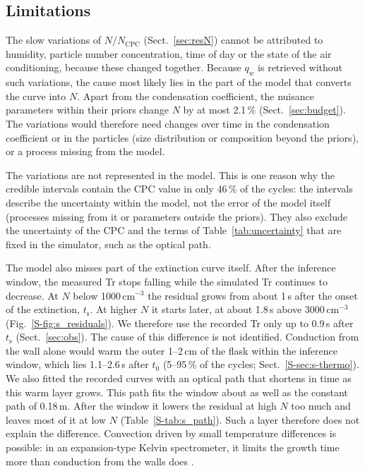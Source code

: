 \documentclass[preprint,review,12pt,authoryear]{elsarticle}
\begin{document}
\subsection{Limitations}
\label{sec:limitations}
The slow variations of $N/N_\mathrm{CPC}$ (Sect.~\ref{sec:resN}) cannot be attributed to
humidity, particle number concentration, time of day or the state of the air conditioning, because these
changed together.
Because $q_w$ is retrieved without such variations, the cause most likely lies in the part of the
model that converts the curve into $N$.
Apart from the condensation coefficient, the nuisance parameters within their priors change $N$ by
at most 2.1\,\% (Sect.~\ref{sec:budget}).
The variations would therefore need changes over time in the condensation coefficient or in the particles
(size distribution or composition beyond the priors), or a process missing from the model.

The variations are not represented in the model.
This is one reason why the credible intervals contain the CPC value in only 46\,\% of the cycles:
the intervals describe the uncertainty within the model, not the error of the model itself (processes
missing from it or parameters outside the priors). They also exclude the uncertainty of the CPC and
the terms of Table~\ref{tab:uncertainty} that are fixed in the simulator, such as the optical path.

The model also misses part of the extinction curve itself. After the inference window, the measured
Tr stops falling while the simulated Tr continues to decrease. At $N$ below 1000\,cm$^{-3}$ the
residual grows from about 1\,s after the onset of the extinction, $t_\mathrm{s}$. At higher $N$ it starts
later, at about 1.8\,s above 3000\,cm$^{-3}$ (Fig.~\ref{S-fig:s_residuals}). We therefore use the
recorded Tr only up to 0.9\,s after $t_\mathrm{s}$ (Sect.~\ref{sec:obs}).
The cause of this difference is not identified.
Conduction from the wall alone would warm the outer 1--2\,cm of the flask within the inference
window, which lies 1.1--2.6\,s after $t_0$ (5--95\,\% of the cycles; Sect.~\ref{S-sec:s-thermo}).
We also fitted the recorded curves with an optical path that shortens in time as this warm layer
grows. This path fits the window about as well as the constant path of 0.18\,m. After the window it
lowers the residual at high $N$ too much and leaves most of it at low $N$ (Table~\ref{S-tab:s_path}).
Such a layer therefore does not explain the difference.
Convection driven by small temperature differences is possible: in an expansion-type Kelvin
spectrometer, it limits the growth time more than conduction from the walls does
\citep{hollander2002theoretical}.
\end{document}
